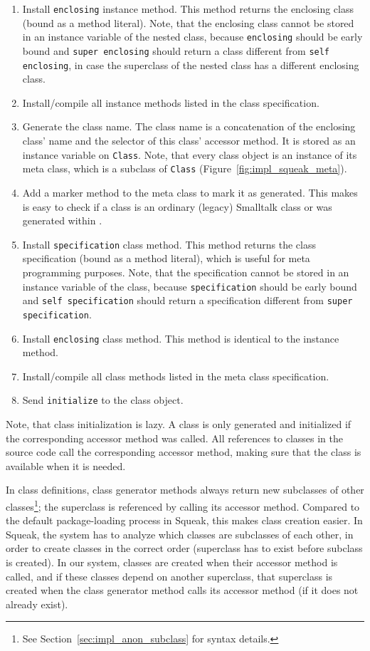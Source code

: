 \begin{enumerate}
	\item Install \texttt{enclosing} instance method. This method returns the enclosing class (bound as a method literal). Note, that the enclosing class cannot be stored in an instance variable of the nested class, because \texttt{enclosing} should be early bound and \texttt{super enclosing} should return a class different from \texttt{self enclosing}, in case the superclass of the nested class has a different enclosing class.
	\item Install/compile all instance methods listed in the class specification.
	\item Generate the class name. The class name is a concatenation of the enclosing class' name and the selector of this class' accessor method. It is stored as an instance variable on \texttt{Class}. Note, that every class object is an instance of its meta class, which is a subclass of \texttt{Class} (Figure~\ref{fig:impl_squeak_meta}).
	\item Add a marker method to the meta class to mark it as generated. This makes is easy to check if a class is an ordinary (legacy) Smalltalk class or was generated within \msname.
	\item Install \texttt{specification} class method. This method returns the class specification (bound as a method literal), which is useful for meta programming purposes. Note, that the specification cannot be stored in an instance variable of the class, because \texttt{specification} should be early bound and \texttt{self specification} should return a specification different from \texttt{super specification}.
	\item Install \texttt{enclosing} class method. This method is identical to the instance method.
	\item Install/compile all class methods listed in the meta class specification.
	\item Send \texttt{initialize} to the class object.
\end{enumerate}

Note, that class initialization is lazy. A class is only generated and initialized if the corresponding accessor method was called. All references to classes in the source code call the corresponding accessor method, making sure that the class is available when it is needed. 

In class definitions, class generator methods always return new subclasses of other classes\footnote{See Section~\ref{sec:impl_anon_subclass} for syntax details.}; the superclass is referenced by calling its accessor method. Compared to the default package-loading process in Squeak, this makes class creation easier. In Squeak, the system has to analyze which classes are subclasses of each other, in order to create classes in the correct order (superclass has to exist before subclass is created). In our system, classes are created when their accessor method is called, and if these classes depend on another superclass, that superclass is created when the class generator method calls its accessor method (if it does not already exist).

